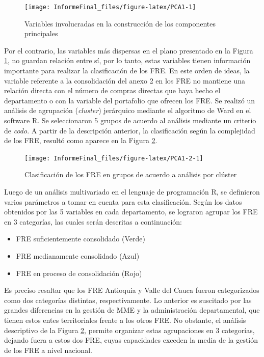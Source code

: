 \documentclass[
]{book}
\begin{document}
\begin{figure}[t]

{\centering \texttt{[image: InformeFinal\_files/figure-latex/PCA1-1]} 

}

\caption{Variables involucradas en la construcción de los componentes principales}\label{fig:PCA1}
\end{figure}

Por el contrario, las variables más dispersas en el plano presentado en la Figura \ref{fig:PCA1}, no guardan relación entre sí, por lo tanto, estas variables tienen información importante para realizar la clasificación de los FRE. En este orden de ideas, la variable referente a la consolidación del anexo 2 en los FRE no mantiene una relación directa con el número de compras directas que haya hecho el departamento o con la variable del portafolio que ofrecen los FRE.
Se realizó un análisis de agrupación (\emph{cluster}) jerárquico mediante el algoritmo de Ward en el software R. Se seleccionaron 5 grupos de acuerdo al análisis mediante un criterio de \emph{codo}. A partir de la descripción anterior, la clasificación según la complejidad de los FRE, resultó como aparece en la Figura \ref{fig:PCA1-2}.

\begin{figure}[t]

{\centering \texttt{[image: InformeFinal\_files/figure-latex/PCA1-2-1]} 

}

\caption{Clasificación de los FRE en grupos de acuerdo a análisis por clúster}\label{fig:PCA1-2}
\end{figure}

Luego de un análisis multivariado en el lenguaje de programación R, se definieron varios parámetros a tomar en cuenta para esta clasificación. Según los datos obtenidos por las 5 variables en cada departamento, se lograron agrupar los FRE en 3 categorías, las cuales serán descritas a continuación:

\begin{itemize}
\item
  FRE suficientemente consolidado (Verde)
\item
  FRE medianamente consolidado (Azul)
\item
  FRE en proceso de consolidación (Rojo)
\end{itemize}

Es preciso resaltar que los FRE Antioquia y Valle del Cauca fueron categorizados como dos categorías distintas, respectivamente. Lo anterior es suscitado por las grandes diferencias en la gestión de MME y la administración departamental, que tienen estos entes territoriales frente a los otros FRE. No obstante, el análisis descriptivo de la Figura \ref{fig:PCA1-2}, permite organizar estas agrupaciones en 3 categorías, dejando fuera a estos dos FRE, cuyas capacidades exceden la media de la gestión de los FRE a nivel nacional.
\end{document}
